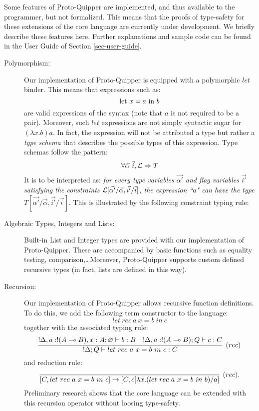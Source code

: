 \documentclass[twoside]{article}
\begin{document}
Some features of Proto-Quipper are implemented, and thus available 
to the programmer, but not formalized. This means that the proofs 
of type-safety for these extensions of the core language are 
currently under development. We briefly describe these features 
here. Further explanations and sample code can be found in the 
User Guide of Section \ref{sec-user-guide}.
\begin{description}
  \item[Polymorphism:] Our implementation of Proto-Quipper is 
    equipped with a polymorphic $let$ binder. This means that 
    expressions such as:
    \[
    \textrm{\rm let}~ x = a ~\textrm{\rm in}~ b
    \]
    are valid expressions of the syntax (note that $a$ is not required 
    to be a pair). Moreover, such $let$ expressions are not simply 
    syntactic sugar for $(\lambda x.b)a$. In fact, the expression
    will not be attributed a type but rather a \emph{type schema} that
    describes the possible types of this expression.
    Type schemas follow the pattern:
    	$$\forall \vec{\alpha}~ \vec{i}, \mathcal{L} \Rightarrow T$$
    It is to be interpreted as: \textit{for every type variables $\vec{\alpha'}$ and flag variables $\vec{i'}$ satisfying
    the constraints $\mathcal{L}[\vec{\alpha'} / \vec{\alpha}, \vec{i'}/ \vec{i}]$, the expression
    ``$a$" can have the type $T[\vec{\alpha'} / \vec{\alpha}, \vec{i'}/ \vec{i}]$}.
		This is illustrated by the following constraint typing rule:
			\begin{prooftree}
				 \noLine
			\end{prooftree}
  \item[Algebraic Types, Integers and Lists:] Built-in List and 
    Integer types are provided with our implementation of Proto-Quipper.
    These are accompanied by basic functions such as equality testing, 
    comparison,\ldots Moreover, Proto-Quipper supports custom defined
    recursive types (in fact, lists are defined in this way).
  \item[Recursion:] Our implementation of Proto-Quipper allows 
    recursive function definitions. To do this, we add the following 
    term constructor to the language:
    \[
    let~rec~ a ~x = b~ in~ c
    \]    
    together with the associated typing rule:
    \[
    \infer[(rec)]{!\Delta;Q \entails let~rec~ a ~x = b~ in~ c:C}{
      !\Delta,a:!(A\loli B), x:A;\varnothing \entails b:B
      &
      !\Delta, a:!(A\loli B) ;Q \entails c:C      
    }
    \]
    and reduction rule:
    \[
    \infer[(rec).]{[C,let~rec~ a ~x = b~ in~ c]\to [C, c[\lambda x.(let~rec~ a ~x = b~ in~ b)/a]}{}
    \]
    Preliminary research shows that the core language can be extended 
    with this recursion operator without loosing type-safety. 
\end{description}
\end{document}
